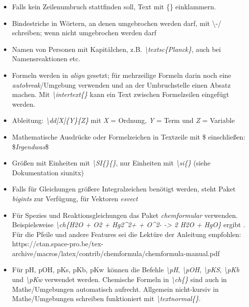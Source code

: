 \documentclass[./main.tex]{subfiles}
\begin{document}
\begin{itemize}
    \item Falls kein Zeilenumbruch stattfinden soll, Text mit \{\} einklammern.  
    \item Bindestriche in W\"ortern, an denen umgebrochen werden darf, mit \textbackslash -/ schreiben; wenn nicht umgebrochen werden darf 
    \item Namen von Personen mit Kapit\"alchen, z.B. \hypertarget{textsc}{\textit{\textbackslash textsc\{Planck\}}}, auch bei Namensreaktionen etc.
    \item Formeln werden in \textit{align} gesetzt; f\"ur mehrzeilige Formeln darin noch eine \textit{autobreak}\-/Umgebung verwenden und an der Umbruchstelle einen Absatz machen. Mit \textit{\hypertarget{intertext}{\textbackslash intertext\{\}}} kann ein Text zwischen Formelzeilen eingef\"ugt werden.  
    \item Ableitung: \textit{\hypertarget{dd}{\textbackslash dd[X]\{Y\}\{Z\}}} mit \textit{X} = Ordnung, \textit{Y} = Term und \textit{Z} = Variable  
    \item Mathematische Ausdr\"ucke oder Formelzeichen in Textzeile mit \$ einschlie\ss{}en:  \$\textit{Irgendwas}\$ 
    \item \hypertarget{SI}{} Gr\"o\ss{}en mit Einheiten mit \textit{\textbackslash SI\{\}\{\}}, nur Einheiten mit \textit{\textbackslash si\{\}} (siehe Dokumentation siunitx)
    \item Falls f\"ur Gleichungen gr\"o\ss{}ere Integralzeichen ben\"otigt werden, steht Paket \textit{bigints} zur Verf\"ugung, f\"ur Vektoren \textit{esvect}
    \item F\"ur Spezies und Reaktionsgleichungen das Paket \textit{chemformular} verwenden. Beispielsweise \textit{\hypertarget{ch}{\textbackslash ch}\{H2O + O2 + Hg2\textasciicircum2+ + O\textasciicircum2- -> 2 H2O + HgO\}} ergibt . F\"ur die Pfeile und andere Features sei die Lekt\"ure der Anleitung empfohlen:  https://ctan.space-pro.be/tex-archive/macros/latex/contrib/chemformula/chemformula-manual.pdf
    \item F\"ur pH, pOH, pKs, pKb, pKw~k\"onnen die Befehle \hypertarget{pH}{} \hypertarget{pKs}{} \hypertarget{pKb}{} \hypertarget{pKw}{} \hypertarget{pOH}{} \textit{\textbackslash pH}, \textit{\textbackslash pOH}, \textit{\textbackslash pKS}, \textit{\textbackslash pKb} und \textit{\textbackslash pKw} verwendet werden. Chemische Formeln in \textit{\textbackslash ch\{\}} sind auch in Mathe\-/Umgebungen automatisch aufrecht. Allgemein nicht-kursiv in Mathe\-/Umgebungen schreiben funktioniert mit \textit{\textbackslash textnormal\{\}}. 

\end{itemize}
\end{document}
